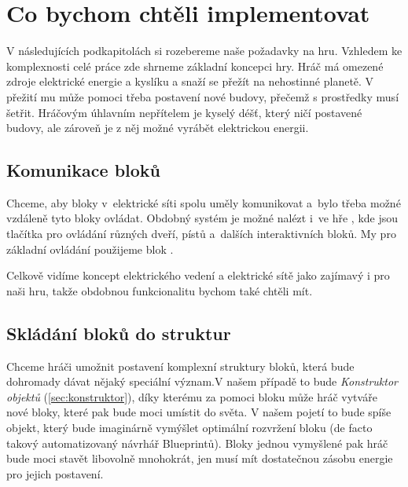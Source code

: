 


\section{Co bychom chtěli implementovat}

V následujících podkapitolách si rozebereme naše požadavky na hru. Vzhledem ke komplexnosti celé práce zde shrneme základní koncepci hry. Hráč má omezené zdroje elektrické energie a kyslíku a snaží se přežít na nehostinné planetě. V přežití mu může pomoci třeba postavení nové budovy, přečemž s prostředky musí šetřit. Hráčovým úhlavním nepřítelem je kyselý déšť, který ničí postavené budovy, ale zároveň je z něj možné vyrábět elektrickou energii. 







\subsection{Komunikace bloků}

Chceme, aby bloky v~elektrické síti spolu uměly komunikovat a~bylo třeba možné vzdáleně tyto bloky ovládat. Obdobný systém je možné nalézt i~ve hře \SE{}, kde jsou tlačítka pro ovládání různých dveří, pístů a~dalších interaktivních bloků. My pro základní ovládání použijeme blok .


Celkově vidíme koncept elektrického vedení a elektrické sítě jako zajímavý i pro naši hru, takže obdobnou funkcionalitu bychom také chtěli mít.

\subsection{Skládání bloků do struktur}

Chceme hráči umožnit postavení komplexní struktury bloků, která bude dohromady dávat nějaký speciální význam.V našem případě to bude \textit{Konstruktor objektů} (\ref{sec:konstruktor}), díky kterému za pomoci bloku  může hráč vytváře nové bloky, které pak bude moci umístit do světa. V našem pojetí to bude spíše objekt, který bude imaginárně vymýšlet optimální rozvržení bloku (de facto takový automatizovaný návrhář Blueprintů). Bloky jednou vymyšlené pak hráč bude moci stavět libovolně mnohokrát, jen musí mít dostatečnou zásobu energie pro jejich postavení.

